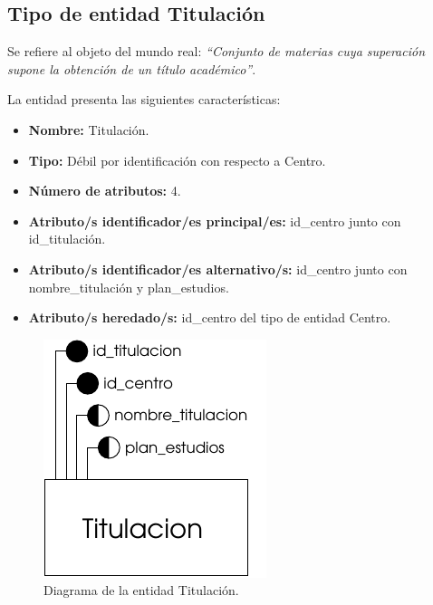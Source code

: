 \subsection{Tipo de entidad Titulación}

   \begin{description}

   \item[Definición] Se refiere al objeto del mundo real: \emph{``Conjunto de
        materias cuya superación supone la obtención de un título académico''}.

   \item[Características] La entidad presenta las siguientes características:
      \begin{itemize}
         \item \textbf{Nombre:} Titulación.
         \item \textbf{Tipo:} Débil por identificación con respecto a Centro.
         \item \textbf{Número de atributos:} 4.
         \item \textbf{Atributo/s identificador/es principal/es:} id\_centro junto con \\id\_titulación.
         \item \textbf{Atributo/s identificador/es alternativo/s:} id\_centro junto con nombre\_titulación y plan\_estudios.
         \item \textbf{Atributo/s heredado/s:} id\_centro del tipo de entidad Centro.
      \end{itemize}

   \item[Diagrama]
   \item \begin{figure}[h!]
            \begin{center}
            \includegraphics[]{07.Modelo_Entidad-Interrelacion/7.2.Analisis_Entidades/diagramas/titulacion.pdf}
            \caption{Diagrama de la entidad Titulación.}
            \end{center}
         \end{figure}


\end{description}
